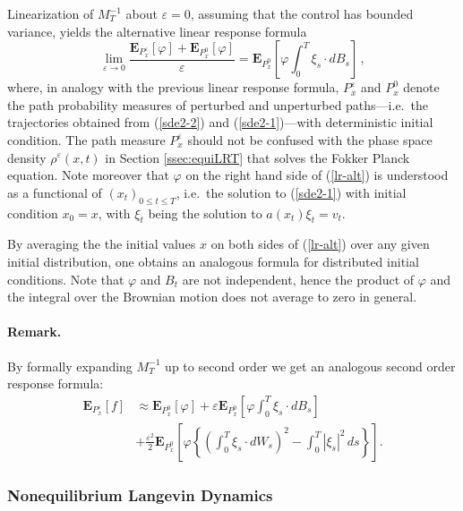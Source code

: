 \documentclass[]{tMPH2e}
\newcommand{\eps}{\varepsilon}
\newcommand{\bE}{{\mathbf E}}
\begin{document}
Linearization of $M_{T}^{-1}$ about $\eps=0$, assuming that the control has bounded variance, yields the alternative linear response formula 
\begin{equation}\label{lr-alt}
\lim_{\eps\to 0}\frac{\bE_{P_{x}^{\eps}}[\varphi] + \bE_{P_{x}^{0}}[\varphi]}{\eps} = \bE_{P_{x}^{0}}\left[\varphi \int_{0}^{T}\xi_{s}\cdot dB_{s} \right]\,,
\end{equation}
where, in analogy with the previous linear response formula, $P_{x}^{\eps}$ and $P_{x}^{0}$ denote the path probability measures of perturbed and unperturbed paths---i.e.~the trajectories obtained from (\ref{sde2-2}) and (\ref{sde2-1})---with deterministic initial condition. The path measure $P^{\eps}_{x}$ should not be confused with the phase space density $\rho^{\eps}(x,t)$ in Section \ref{ssec:equiLRT} that solves the Fokker Planck equation. Note moreover that $\varphi$ on the right hand side of (\ref{lr-alt}) is understood as a functional of $(x_{t})_{0\le t\le T}$, i.e.~the solution to (\ref{sde2-1}) with initial condition $x_{0}=x$, with $\xi_{t}$ being the solution to $a(x_{t})\xi_{t}=v_{t}$. 

By averaging the the initial values $x$ on both sides of (\ref{lr-alt}) over any given initial distribution, one obtains an analogous formula for distributed initial conditions. Note that $\varphi$ and $B_{t}$ are not independent, hence the product of $\varphi$ and the integral over the Brownian motion does not average to zero in general. 


\paragraph*{Remark.} 
By formally expanding $M^{-1}_T$ up to second order we get an analogous second order response formula: 
\begin{equation}\label{2nd}
\begin{aligned}
\bE_{P_{x}^{\eps}}[f] & \approx \bE_{P_{x}^{0}}[\varphi]  + \eps \bE_{P_{x}^{0}}\left[\varphi\int_{0}^{T}\xi_{s}\cdot dB_{s} \right]\\  
& + \frac{\eps^{2}}{2} \bE_{P_{x}^{0}}\left[\varphi\left\{\left(\int_{0}^{T}\xi_{s}\cdot dW_{s}\right)^2 -\int_0^T |\xi_s|^2\,ds\right\} \right].
\end{aligned}
\end{equation}


 
 

\subsubsection*{Nonequilibrium Langevin Dynamics}
\end{document}
